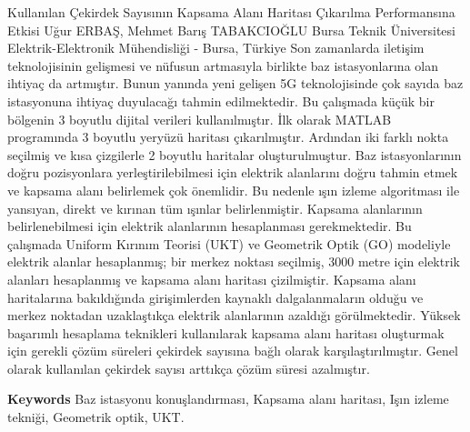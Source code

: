 
    \begin{abstract_online}{Kullanılan Çekirdek Sayısının Kapsama Alanı Haritası Çıkarılma Performansına Etkisi}{%
        Uğur ERBAŞ, Mehmet Barış TABAKCIOĞLU}{%
        }{%
        Bursa Teknik Üniversitesi Elektrik-Elektronik Mühendisliği - Bursa, Türkiye}
    Son zamanlarda iletişim teknolojisinin gelişmesi ve nüfusun artmasıyla birlikte baz istasyonlarına olan ihtiyaç da artmıştır. Bunun yanında yeni gelişen 5G teknolojisinde çok sayıda baz istasyonuna ihtiyaç duyulacağı tahmin edilmektedir. Bu çalışmada küçük bir bölgenin 3 boyutlu dijital verileri kullanılmıştır. İlk olarak MATLAB programında 3 boyutlu yeryüzü haritası çıkarılmıştır. Ardından iki farklı nokta seçilmiş ve kısa çizgilerle 2 boyutlu haritalar oluşturulmuştur. Baz istasyonlarının doğru pozisyonlara yerleştirilebilmesi için elektrik alanlarını doğru tahmin etmek ve kapsama alanı belirlemek çok önemlidir. Bu nedenle ışın izleme algoritması ile yansıyan, direkt ve kırınan tüm ışınlar belirlenmiştir. Kapsama alanlarının belirlenebilmesi için elektrik alanlarının hesaplanması gerekmektedir. Bu çalışmada Uniform Kırınım Teorisi (UKT) ve Geometrik Optik (GO) modeliyle elektrik alanlar hesaplanmış; bir merkez noktası seçilmiş, 3000 metre için elektrik alanları hesaplanmış ve kapsama alanı haritası çizilmiştir. Kapsama alanı haritalarına bakıldığında girişimlerden kaynaklı dalgalanmaların olduğu ve merkez noktadan uzaklaştıkça elektrik alanlarının azaldığı görülmektedir. Yüksek başarımlı hesaplama teknikleri kullanılarak kapsama alanı haritası oluşturmak için gerekli çözüm süreleri çekirdek sayısına bağlı olarak karşılaştırılmıştır. Genel olarak kullanılan çekirdek sayısı arttıkça çözüm süresi azalmıştır. 
    
        \textbf{Keywords} \newline{}Baz istasyonu konuşlandırması, Kapsama alanı haritası, Işın izleme tekniği, Geometrik optik, UKT.
    \end{abstract_online}
    